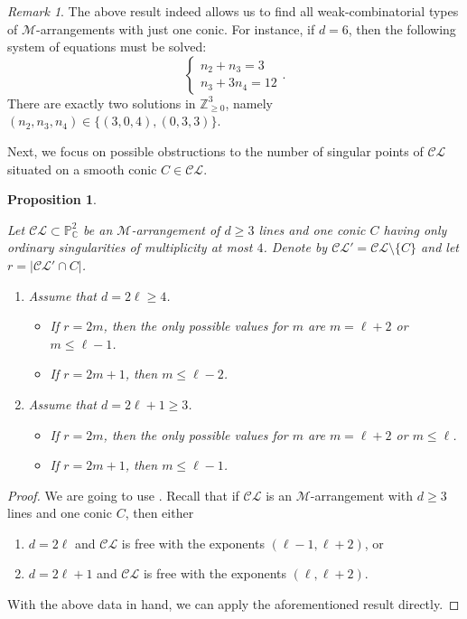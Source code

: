\documentclass[11pt]{article}
\theoremstyle{plain}
\newtheorem{proposition}[theorem]{Proposition}
\theoremstyle{definition}
\theoremstyle{remark}
\newtheorem{remark}[theorem]{Remark}
\begin{document}
\begin{remark}
The above result indeed allows us to find all weak-combinatorial types of $\mathscr{M}$-arrangements with just one conic. For instance, if $d=6$, then the following system of equations must be solved:
$$\begin{cases}
n_{2}+n_{3}=3\\
n_{3}+3n_{4}=12
\end{cases}.$$
There are exactly two solutions in $\mathbb{Z}_{\geq 0}^3$, namely $(n_{2},n_{3},n_{4}) \in \{(3,0,4),(0,3,3)\}$.
\end{remark}
Next, we focus on possible obstructions to the number of singular points of $\mathcal{CL}$ situated on a smooth conic $C \in \mathcal{CL}$. 
\begin{proposition}
\label{mvp}

Let $\mathcal{CL} \subset \mathbb{P}^{2}_\mathbb{C}$ be an $\mathscr{M}$-arrangement of $d\geq 3$ lines and one conic $C$ having only ordinary singularities of multiplicity at most $4$. Denote by $\mathcal{CL}' = \mathcal{CL}\setminus \{C\}$ and let $r = |\mathcal{CL}' \cap C|$. 
\begin{enumerate}
\item[\textbf{a)}] Assume that $d = 2\ell \geq 4$. 
\begin{itemize}
    \item[$(\bullet)$] If $r=2m$, then the only possible values for $m$ are $m= \ell+2$ or $m \leq \ell-1$.
    \item[$(\bullet \bullet)$] If $r=2m+1$, then $m \leq \ell-2$.
\end{itemize}
\item[\textbf{b)}] Assume that $d = 2\ell + 1 \geq 3$. 
\begin{itemize}
    \item[$(\bullet)$] If $r=2m$, then the only possible values for $m$ are $m=\ell+2$ or $m \leq \ell$.
    \item[$(\bullet \bullet)$] If $r=2m+1$, then $m \leq \ell-1$.
\end{itemize}
\end{enumerate}
\end{proposition}
\begin{proof}
 We are going to use \cite[Theorem 1.4 (i)]{Macinic}. Recall that if $\mathcal{CL}$ is an $\mathscr{M}$-arrangement with $d\geq 3$ lines and one conic $C$, then either
 \begin{enumerate}
\item $d = 2\ell$ and $\mathcal{CL}$ is free with the exponents $(\ell-1, \ell+2)$, or
\item $d = 2\ell +1$ and $\mathcal{CL}$ is free with the exponents $(\ell, \ell+2)$.
 \end{enumerate}
 With the above data in hand, we can apply the aforementioned result directly.
\end{proof}
\end{document}
